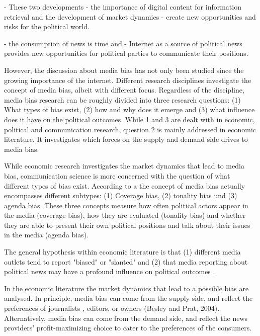 \documentclass[12pt,a4paper,notitlepage]{article}
\begin{document}
- These two developments - the importance of digital content for information retrieval and the development of market dynamics - create new opportunities and risks for the political world. 


- the consumption of news is time and 
- Internet as a source of political news provides new opportunities for political parties to communicate their positions. 

However, the discussion about media bias has not only been studied since the growing importance of the internet. Different research disciplines investigate the concept of media bias, albeit with different focus. Regardless of the discipline, media bias research can be roughly divided into three research questions: (1) What types of bias exist, (2) how and why does it emerge and (3) what influence does it have on the political outcomes. While 1 and 3 are dealt with in economic, political and communication research, question 2 is mainly addressed in economic literature. It investigates which forces on the supply and demand side drives to media bias.  

 While economic research investigates the market dynamics that lead to media bias, communication science is more concerned with the question of what different types of bias exist. According to a \citet{dalessio_media_2000} the concept of media bias actually encompasses different subtypes: (1) Coverage bias, (2) tonality bias und (3) agenda bias. These three concepts measure how often political actors appear in the media (coverage bias), how they are evaluated (tonality bias) and whether they are able to present their own political positions and talk about their issues in the media (agenda bias).

The general hypothesis within economic literature is that (1) different media outlets tend to report "biased" or "slanted" \citep{groseclose_measure_2005, lott_is_2014} and (2) that media reporting about political news may have a profound influence on political outcomes \citep{gentzkow_media_2004, stromberg_radios_2004, dellavigna_fox_2006, snyder_press_2010, gentzkow_television_2006}. 

In the economic literature the market dynamics that lead to a possible bias are analysed. In principle, media bias can come from the supply side, and reflect the preferences of journalists \citep{baron_persistent_2006}, editors, or owners (Besley and Prat, 2004). Alternatively, media bias can come from the demand side, and reflect the news providers' profit-maximizing choice to cater to the preferences of the consumers. 
\end{document}
